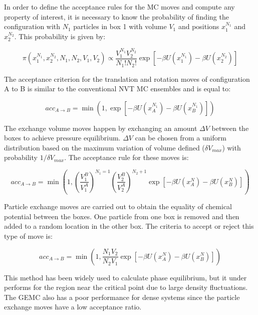 	In order to define the acceptance rules for the MC moves and compute any property of interest, it is necessary to know the probability of finding the configuration with $N_{1}$ particles in box 1 with volume $V_{1}$ and positions $x_{1}^{N_{1}}$ and $x_{2}^{N_{2}}$. This probability is given by:
	
	\begin{equation}
	\pi(x_{1}^{N_{1}},x_{2}^{N_{2}},N_{1},N_{2},V_{1},V_{2}) \propto \dfrac{V_{1}^{N_{1}}V_{2}^{N_{2}}}{N_{1}!N_{2}!} \exp[-\beta U(x_{1}^{N_{1}}) -\beta U(x_{2}^{N_{2}})]
	\label{eqn:geprob}
	\end{equation}
	
	The acceptance criterion for the translation and rotation moves of configuration A	to B is similar to the conventional NVT MC ensembles and is equal to:
	
	\begin{equation}
	acc_{A \rightarrow B} = \min(1,\exp[-\beta U(x_{A}^{N_{1}}) -\beta U(x_{B}^{N_{1}})])
	\label{eqn:drprob}
	\end{equation} 
	
	The exchange volume moves happen by exchanging an amount $\Delta V$ between the boxes to achieve pressure equilibrium. $\Delta V$ can be chosen from a uniform distribution based on the maximum variation of volume defined ($\delta V_{max}$) with probability $1/\delta V_{max}$. The acceptance rule for these moves is: 
	
	\begin{equation}
	acc_{A \rightarrow B} = \min \left(1, \left(\dfrac{V_{1}^{B}}{V_{1}^{A}} \right)^{N_{1}=1} \left( \dfrac{V_{2}^{B}}{V_{2}^{A}} \right)^{N_{2}+1} \exp[-\beta U(x_{A}^{N}) -\beta U(x_{B}^{N})] \right)
	\label{vprob}
	\end{equation}
	
	Particle exchange moves are carried out to obtain the equality of chemical potential between the boxes. One particle from one box is removed and then added to a random location in the other box. The criteria to accept or reject this type of move is:
	
	\begin{equation}
	acc_{A \rightarrow B} = \min \left( 1, \dfrac{N_{1}V_{2}}{N_{2}V_{1}}  \exp[-\beta U(x_{A}^{N}) -\beta U(x_{B}^{N})] \right)
	\label{moleprob}
	\end{equation}
	
	This method has been widely used to calculate phase equilibrium, but it under performs for the region near the critical point due to large density fluctuations. The GEMC also has a poor performance for dense systems since the particle exchange moves have a low acceptance ratio.  
	
	
	
	
	
